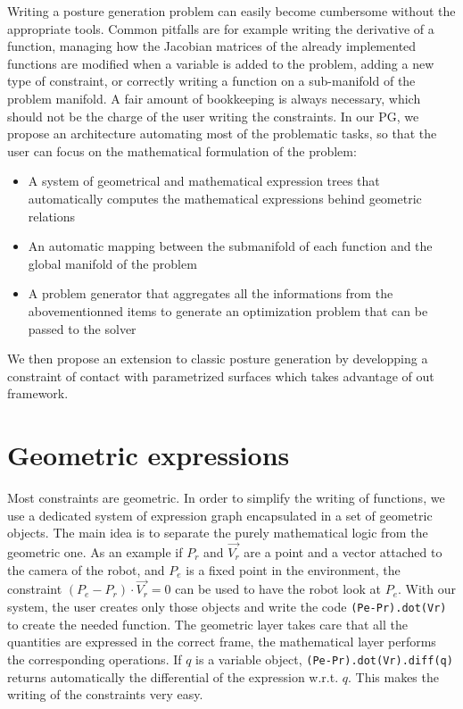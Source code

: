 Writing a posture generation problem can easily become cumbersome without the appropriate tools.
Common pitfalls are for example writing the derivative of a function, managing how the Jacobian matrices of the already implemented functions are modified when a variable is added to the problem, adding a new type of constraint, or correctly writing a function on a sub-manifold of the problem manifold.
A fair amount of bookkeeping is always necessary, which should not be the charge of the user writing the constraints.
In our PG, we propose an architecture automating most of the problematic tasks, so that the user can focus on the mathematical formulation of the problem:
\begin{itemize}
  \item A system of geometrical and mathematical expression trees that automatically computes the mathematical expressions behind geometric relations
  \item An automatic mapping between the submanifold of each function and the global manifold of the problem
  \item A problem generator that aggregates all the informations from the abovementionned items to generate an optimization problem that can be passed to the solver
\end{itemize}
We then propose an extension to classic posture generation by developping a constraint of contact with parametrized surfaces which takes advantage of out framework.



\section{Geometric expressions}
\label{sec:geometric_expressions}

Most constraints are geometric.
In order to simplify the writing of functions, we use a dedicated system of expression graph encapsulated in a set of geometric objects.
The main idea is to separate the purely mathematical logic from the geometric one.
As an example if $P_r$ and $\overrightarrow{V_r}$ are a point and a vector attached to the camera of the robot, and $P_e$ is a fixed point in the environment, the constraint $(P_e - P_r)\cdot \overrightarrow{V_r} = 0$ can be used to have the robot look at $P_e$.
With our system, the user creates only those objects and write the code \texttt{(Pe-Pr).dot(Vr)} to create the needed function.
The geometric layer takes care that all the quantities are expressed in the correct frame, the mathematical layer performs the corresponding operations.
If $q$ is a variable object, \texttt{(Pe-Pr).dot(Vr).diff(q)} returns automatically the differential of the expression w.r.t. $q$. This makes the writing of the constraints very easy.


